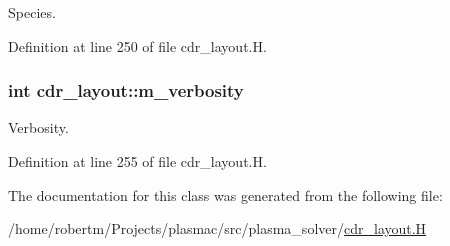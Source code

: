Species. 



Definition at line 250 of file cdr\+\_\+layout.\+H.

\subsubsection[{\texorpdfstring{m\+\_\+verbosity}{m_verbosity}}]{\setlength{\rightskip}{0pt plus 5cm}int cdr\+\_\+layout\+::m\+\_\+verbosity\hspace{0.3cm}{\ttfamily [protected]}}\hypertarget{classcdr__layout_a0f5e1ccac2be9b4135b10bc94cf6b2c3}{}\label{classcdr__layout_a0f5e1ccac2be9b4135b10bc94cf6b2c3}


Verbosity. 



Definition at line 255 of file cdr\+\_\+layout.\+H.



The documentation for this class was generated from the following file\+:\begin{DoxyCompactItemize}
\item 
/home/robertm/\+Projects/plasmac/src/plasma\+\_\+solver/\hyperlink{cdr__layout_8H}{cdr\+\_\+layout.\+H}\end{DoxyCompactItemize}
